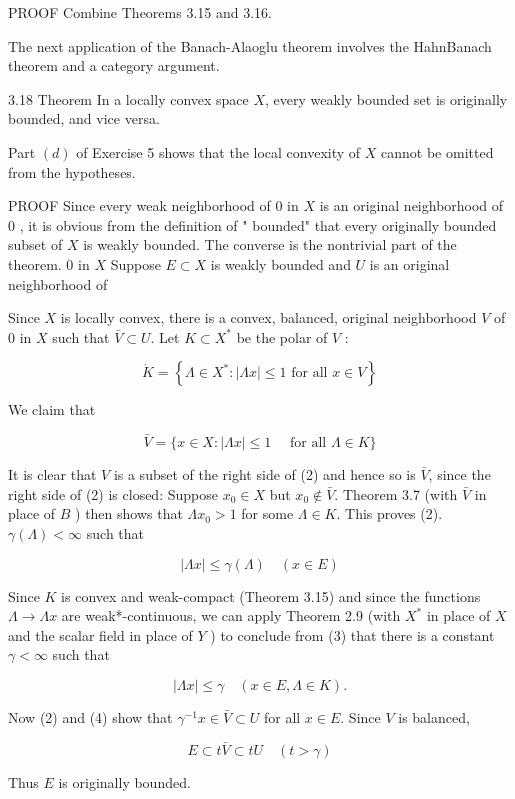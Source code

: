 \documentclass[10pt]{article}
\begin{document}
PROOF Combine Theorems 3.15 and 3.16.

The next application of the Banach-Alaoglu theorem involves the HahnBanach theorem and a category argument.

3.18 Theorem In a locally convex space $X$, every weakly bounded set is originally bounded, and vice versa.

Part $(d)$ of Exercise 5 shows that the local convexity of $X$ cannot be omitted from the hypotheses.

PROOF Since every weak neighborhood of 0 in $X$ is an original neighborhood of 0 , it is obvious from the definition of " bounded" that every originally bounded subset of $X$ is weakly bounded. The converse is the nontrivial part of the theorem. 0 in $X$ Suppose $E \subset X$ is weakly bounded and $U$ is an original neighborhood of

Since $X$ is locally convex, there is a convex, balanced, original neighborhood $V$ of 0 in $X$ such that $\bar{V} \subset U$. Let $K \subset X^{*}$ be the polar of $V$ :

$$
\dot{K}=\left\{\Lambda \in X^{*}:|\Lambda x| \leq 1 \text { for all } x \in V\right\}
$$

We claim that

$$
\bar{V}=\{x \in X:|\Lambda x| \leq 1 \quad \text { for all } \Lambda \in K\}
$$

It is clear that $V$ is a subset of the right side of (2) and hence so is $\bar{V}$, since the right side of (2) is closed: Suppose $x_{0} \in X$ but $x_{0} \notin \bar{V}$. Theorem 3.7 (with $\bar{V}$ in place of $B$ ) then shows that $\Lambda x_{0}>1$ for some $\Lambda \in K$. This proves (2). $\gamma(\Lambda)<\infty$ such that

$$
|\Lambda x| \leq \gamma(\Lambda) \quad(x \in E)
$$

Since $K$ is convex and weak-compact (Theorem 3.15) and since the functions $\Lambda \rightarrow \Lambda x$ are weak*-continuous, we can apply Theorem 2.9 (with $X^{*}$ in place of $X$ and the scalar field in place of $Y$ ) to conclude from (3) that there is a constant $\gamma<\infty$ such that

$$
|\Lambda x| \leq \gamma \quad(x \in E, \Lambda \in K) .
$$

Now (2) and (4) show that $\gamma^{-1} x \in \bar{V} \subset U$ for all $x \in E$. Since $V$ is balanced,

$$
E \subset t \bar{V} \subset t U \quad(t>\gamma)
$$

Thus $E$ is originally bounded.
\end{document}
